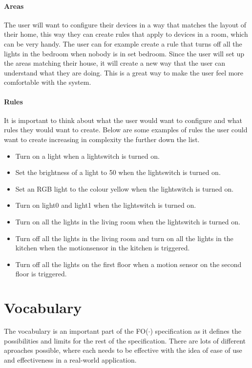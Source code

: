 \documentclass[11pt,a4paper]{report}
\newcommand{\fodot}{FO($\cdot$)\xspace}
\begin{document}
\paragraph{Areas}
The user will want to configure their devices in a way that matches the layout of their home, this way they can create rules that apply to devices in a room, which can be very handy. The user can for example create a rule that turns off all the lights in the bedroom when nobody is in set bedroom. Since the user will set up the areas matching their house, it will create a new way that the user can understand what they are doing. This is a great way to make the user feel more comfortable with the system.
\paragraph{Rules}
It is important to think about what the user would want to configure and what rules they would want to create. Below are some examples of rules the user could want to create increasing in complexity the further down the list.
\begin{itemize}
    \item Turn on a light when a lightswitch is turned on.
    \item Set the brightness of a light to 50 when the lightswitch is turned on.
    \item Set an RGB light to the colour yellow when the lightswitch is turned on.
    \item Turn on light0 and light1 when the lightswitch is turned on.
    \item Turn on all the lights in the living room when the lightswitch is turned on.
    \item Turn off all the lights in the living room and turn on all the lights in the kitchen when the motionsensor in the kitchen is triggered.
    \item Turn off all the lights on the first floor when a motion sensor on the second floor is triggered.
\end{itemize}

\section{Vocabulary}
The vocabulary is an important part of the \fodot specification as it defines the possibilities and limits for the rest of the specification. There are lots of different aproaches possible, where each needs to be effective with the idea of ease of use and effectiveness in a real-world application.
\end{document}
